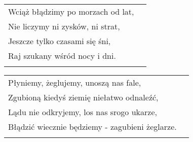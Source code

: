 \documentclass[a5paper]{article}
\begin{document}
\noindent
\begin{tabular}{@{}p{8.20cm}p{3cm}@{}}
Wciąż błądzimy po morzach od lat,	\\
Nie liczymy ni zysków, ni strat,	\\
Jeszcze tylko czasami się śni,	\\
Raj szukany wśród nocy i dni.	\\ \\
\end{tabular}

\noindent
\begin{tabular}{@{}p{8.20cm}p{3cm}@{}}
Płyniemy, żeglujemy, unoszą nas fale,	\\
Zgubioną kiedyś ziemię niełatwo odnaleźć,	\\
Lądu nie odkryjemy, los nas srogo ukarze,	 \\
Błądzić wiecznie będziemy - zagubieni żeglarze. \\ \\
\end{tabular}
\end{document}
